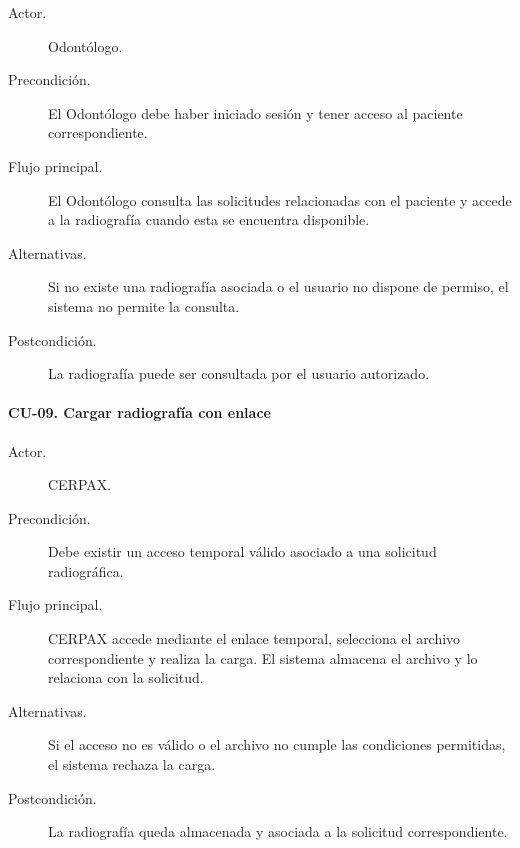 \begin{description}
	
	\item[Actor.] Odontólogo.
	
	\item[Precondición.] El Odontólogo debe haber iniciado sesión y tener acceso
	al paciente correspondiente.
	
	\item[Flujo principal.] El Odontólogo consulta las solicitudes relacionadas
	con el paciente y accede a la radiografía cuando esta se encuentra
	disponible.
	
	\item[Alternativas.] Si no existe una radiografía asociada o el usuario no
	dispone de permiso, el sistema no permite la consulta.
	
	\item[Postcondición.] La radiografía puede ser consultada por el usuario
	autorizado.
	
\end{description}


\paragraph{CU-09. Cargar radiografía con enlace}

\begin{description}
	
	\item[Actor.] CERPAX.
	
	\item[Precondición.] Debe existir un acceso temporal válido asociado a una
	solicitud radiográfica.
	
	\item[Flujo principal.] CERPAX accede mediante el enlace temporal, selecciona
	el archivo correspondiente y realiza la carga. El sistema almacena el archivo
	y lo relaciona con la solicitud.
	
	\item[Alternativas.] Si el acceso no es válido o el archivo no cumple las
	condiciones permitidas, el sistema rechaza la carga.
	
	\item[Postcondición.] La radiografía queda almacenada y asociada a la
	solicitud correspondiente.
	
\end{description}


